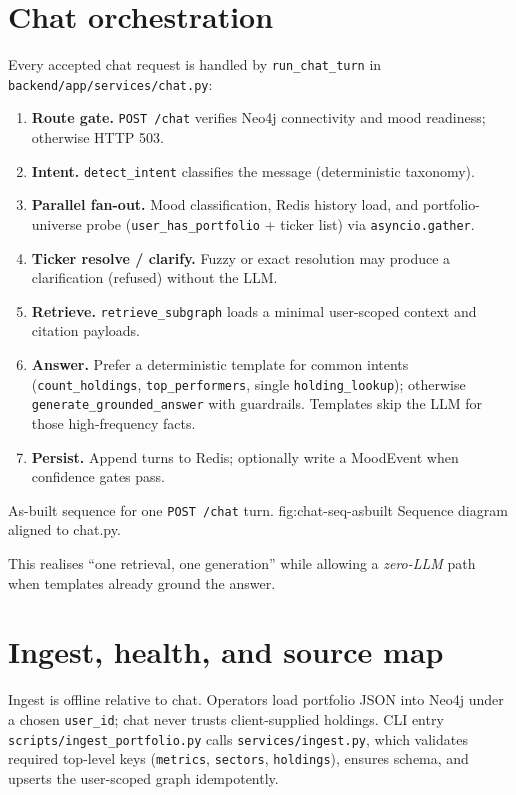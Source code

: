 \section{Chat orchestration}
\label{sec:chat-orch}

Every accepted chat request is handled by \texttt{run\_chat\_turn} in \texttt{backend/app/services/chat.py}:

\begin{enumerate}[leftmargin=*]
  \item \textbf{Route gate.} \texttt{POST /chat} verifies Neo4j connectivity and mood readiness; otherwise HTTP 503.
  \item \textbf{Intent.} \texttt{detect\_intent} classifies the message (deterministic taxonomy).
  \item \textbf{Parallel fan-out.} Mood classification, Redis history load, and portfolio-universe probe (\texttt{user\_has\_portfolio} + ticker list) via \texttt{asyncio.gather}.
  \item \textbf{Ticker resolve / clarify.} Fuzzy or exact resolution may produce a clarification (refused) without the LLM.
  \item \textbf{Retrieve.} \texttt{retrieve\_subgraph} loads a minimal user-scoped context and citation payloads.
  \item \textbf{Answer.} Prefer a deterministic template for common intents (\texttt{count\_holdings}, \texttt{top\_performers}, single \texttt{holding\_lookup}); otherwise \texttt{generate\_grounded\_answer} with guardrails. Templates skip the LLM for those high-frequency facts.
  \item \textbf{Persist.} Append turns to Redis; optionally write a MoodEvent when confidence gates pass.
\end{enumerate}

%
{As-built sequence for one \texttt{POST /chat} turn.}%
{fig:chat-seq-asbuilt}%
{Sequence diagram aligned to chat.py.}

\noindent
This realises ``one retrieval, one generation'' while allowing a \emph{zero-LLM} path when templates already ground the answer.

\section{Ingest, health, and source map}

Ingest is offline relative to chat. Operators load portfolio JSON into Neo4j under a chosen \texttt{user\_id}; chat never trusts client-supplied holdings. CLI entry \texttt{scripts/ingest\_portfolio.py} calls \texttt{services/ingest.py}, which validates required top-level keys (\texttt{metrics}, \texttt{sectors}, \texttt{holdings}), ensures schema, and upserts the user-scoped graph idempotently.

